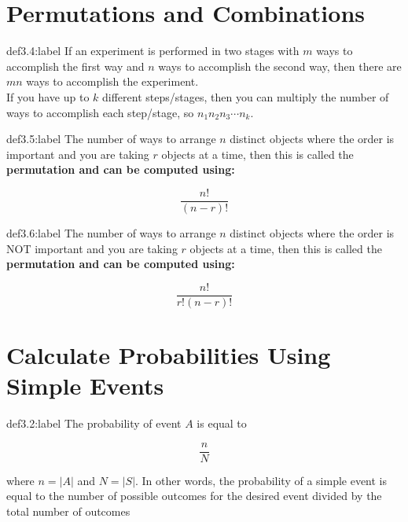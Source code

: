 \section{Permutations and Combinations}

\begin{definition}{def3.4:label}
    If an experiment is performed in two stages with $m$ ways to accomplish the first way and $n$ ways to accomplish the second way, then there are $mn$ ways to accomplish the experiment.\\

    If you have up to $k$ different steps/stages, then you can multiply the number of ways to accomplish each step/stage, so $n_1n_2n_3\cdots n_k$.
\end{definition}

\begin{definition}[Permutations]{def3.5:label}
    The number of ways to arrange $n$ distinct objects where the order is important and you are taking $r$ objects at a time, then this is called the \bf{permutation} and can be computed using:

    $$
        \frac{n!}{(n-r)!} 
    $$
\end{definition}

\begin{definition}[Combinations]{def3.6:label}
    The number of ways to arrange $n$ distinct objects where the order is NOT important and you are taking $r$ objects at a time, then this is called the \bf{permutation} and can be computed using:

    $$
        \frac{n!}{r!(n-r)!} 
    $$
\end{definition}


\section{Calculate Probabilities Using Simple Events}

\begin{definition}{def3.2:label}
    The probability of event $A$ is equal to 

    $$
    \frac{n}{N}
    $$

    where $n = |A|$ and $N = |S|$. In other words, the probability of a simple event is equal to the number of possible outcomes for the desired event divided by the total number of outcomes
\end{definition}

